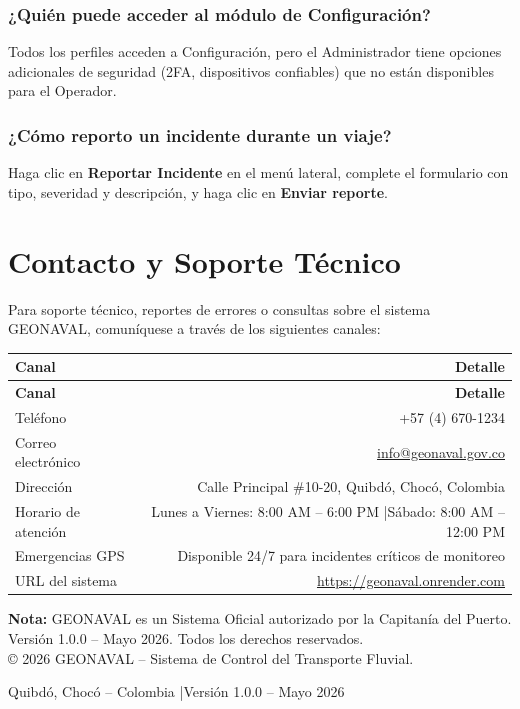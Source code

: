 \documentclass[12pt,a4paper]{article}
\begin{document}
\subsubsection*{¿Quién puede acceder al módulo de Configuración?}
Todos los perfiles acceden a Configuración, pero el Administrador tiene opciones adicionales de seguridad (2FA, dispositivos confiables) que no están disponibles para el Operador.

\subsubsection*{¿Cómo reporto un incidente durante un viaje?}
Haga clic en \textbf{Reportar Incidente} en el menú lateral, complete el formulario con tipo, severidad y descripción, y haga clic en \textbf{Enviar reporte}.

\section{Contacto y Soporte Técnico}

Para soporte técnico, reportes de errores o consultas sobre el sistema GEONAVAL, comuníquese a través de los siguientes canales:

\begin{longtable}{LR}
  \toprule
  \textbf{Canal} & \textbf{Detalle} \\
  \midrule
  \endfirsthead
  \toprule
  \textbf{Canal} & \textbf{Detalle} \\
  \midrule
  \endhead
  \bottomrule
  \endfoot
  Teléfono           & +57 (4) 670-1234 \\[4pt]
  Correo electrónico & \href{mailto:info@geonaval.gov.co}{info@geonaval.gov.co} \\[4pt]
  Dirección          & Calle Principal \#10-20, Quibdó, Chocó, Colombia \\[4pt]
  Horario de atención & Lunes a Viernes: 8:00 AM -- 6:00 PM \quad|\quad Sábado: 8:00 AM -- 12:00 PM \\[4pt]
  Emergencias GPS    & Disponible 24/7 para incidentes críticos de monitoreo \\[4pt]
  URL del sistema    & \url{https://geonaval.onrender.com} \\
\end{longtable}

\vspace{1em}
\begin{notabox}
\textbf{Nota:} GEONAVAL es un Sistema Oficial autorizado por la Capitanía del Puerto. Versión 1.0.0 -- Mayo 2026. Todos los derechos reservados.\\
\copyright{} 2026 GEONAVAL -- Sistema de Control del Transporte Fluvial.
\end{notabox}

\vfill
\begin{center}
  \small Quibdó, Chocó -- Colombia \quad|\quad Versión 1.0.0 -- Mayo 2026
\end{center}
\end{document}
